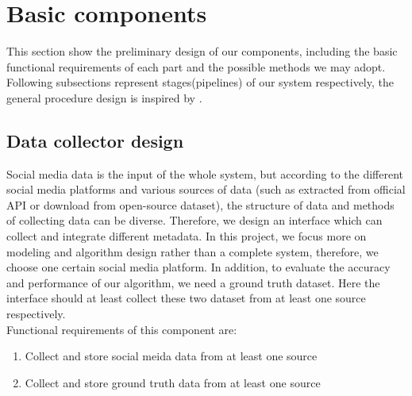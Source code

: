 \section{Basic components}
This section show the preliminary design of our components, including the basic functional requirements of each part and the possible methods we may adopt. Following subsections represent stages(pipelines) of our system respectively, the general procedure design is inspired by \cite{feldman2007text}.
\subsection{Data collector design}
\label{sec:Data collector design}
Social media data is the input of the whole system, but according to the different social media platforms and various sources of data (such as extracted from official API or download from open-source dataset), the structure of data and methods of collecting data can be diverse. Therefore, we design an interface which can collect and integrate different metadata. In this project, we focus more on modeling and algorithm design rather than a complete system, therefore, we choose one certain social media platform. In addition, to evaluate the accuracy and performance of our algorithm, we need a ground truth dataset. Here the interface should at least collect these two dataset from at least one source respectively.\\
Functional requirements of this component are:
\begin{enumerate}
    \item Collect and store social meida data from at least one source
    \item Collect and store ground truth data from at least one source
\end{enumerate}
